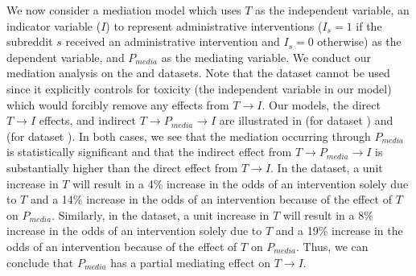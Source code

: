 % 
 We now consider
a mediation model which uses $T$ as the independent variable, an indicator
variable ($I$) to represent administrative interventions ($I_s=1$ if the
subreddit $s$ received an administrative intervention and
$I_s=0$ otherwise) as the dependent variable, and $P_{media}$ as the mediating
variable. We conduct our mediation analysis on the  and  datasets.
Note that the  dataset cannot be used since it explicitly controls for
toxicity (the independent variable in our model) which would forcibly remove
any effects from $T\rightarrow I$.
Our models, the direct $T \rightarrow I$ effects, and indirect $T \rightarrow
P_{media} \rightarrow I$ are illustrated in
 (for dataset ) and 
 (for dataset ). In both
cases, we see that the mediation occurring through $P_{media}$ is statistically
significant and that the indirect effect from $T \rightarrow P_{media}
\rightarrow I$ is substantially higher than the direct effect from $T
\rightarrow I$. In the  dataset, a unit increase in $T$ will result in
a 4\% increase in the odds of an intervention solely due to $T$ and a 14\%
increase in the odds of an intervention because of the effect of $T$ on
$P_{media}$. Similarly, in the  dataset, a unit increase in $T$ will
result in a 8\% increase in the odds of an intervention solely due to $T$ and
a 19\% increase in the odds of an intervention because of the effect of $T$ on
$P_{media}$. Thus, we can conclude that $P_{media}$ has a partial
mediating effect on $T \rightarrow I$. %

